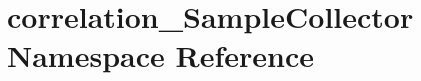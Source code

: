 \hypertarget{namespacecorrelation__SampleCollector}{
\section{correlation\_\-SampleCollector Namespace Reference}
\label{namespacecorrelation__SampleCollector}
}
